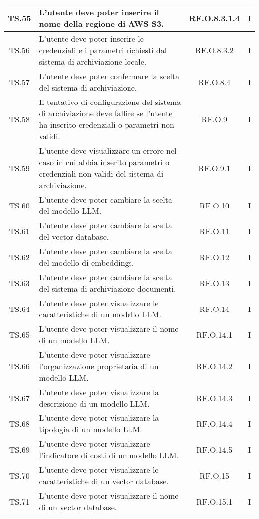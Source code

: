 {{{{{{{{{\begin{xltabular}{\textwidth}{|c|X|c|c|}
    \hline
    TS.55 & L’utente deve poter inserire il nome della regione di AWS S3. & RF.O.8.3.1.4 & I \\
    \hline
    TS.56 & L’utente deve poter inserire le credenziali e i parametri richiesti dal sistema di archiviazione locale. & RF.O.8.3.2 & I \\
    \hline
    TS.57 & L’utente deve poter confermare la scelta del sistema di archiviazione. & RF.O.8.4 & I \\
    \hline
    TS.58 & Il tentativo di configurazione del sistema di archiviazione deve fallire se l’utente ha inserito credenziali o parametri non validi. & RF.O.9 & I \\
    \hline
    TS.59 & L’utente deve visualizzare un errore nel caso in cui abbia inserito parametri o credenziali non validi del sistema di archiviazione. & RF.O.9.1 & I \\
    \hline
    TS.60 & L’utente deve poter cambiare la scelta del modello LLM. & RF.O.10 & I \\
    \hline
    TS.61 & L’utente deve poter cambiare la scelta del vector database. & RF.O.11 & I \\
    \hline
    TS.62 & L’utente deve poter cambiare la scelta del modello di embeddings. & RF.O.12 & I \\
    \hline
    TS.63 & L’utente deve poter cambiare la scelta del sistema di archiviazione documenti. & RF.O.13 & I \\
    \hline
    TS.64 & L’utente deve poter visualizzare le caratteristiche di un modello LLM. & RF.O.14 & I \\
    \hline
    TS.65 & L’utente deve poter visualizzare il nome di un modello LLM. & RF.O.14.1 & I \\
    \hline
    TS.66 & L’utente deve poter visualizzare l’organizzazione proprietaria di un modello LLM. & RF.O.14.2 & I \\
    \hline
    TS.67 & L’utente deve poter visualizzare la descrizione di un modello LLM. & RF.O.14.3 & I \\
    \hline
    TS.68 & L’utente deve poter visualizzare la tipologia di un modello LLM. & RF.O.14.4 & I \\
    \hline
    TS.69 & L’utente deve poter visualizzare l’indicatore di costi di un modello LLM. & RF.O.14.5 & I \\
    \hline
    TS.70 & L’utente deve poter visualizzare le caratteristiche di un vector database. & RF.O.15 & I \\
    \hline
    TS.71 & L’utente deve poter visualizzare il nome di un vector database. & RF.O.15.1 & I \\

\end{xltabular}}}}}}}}}}
